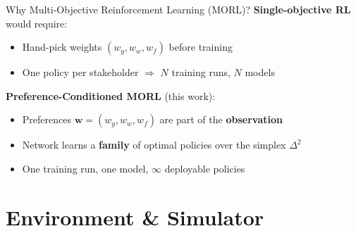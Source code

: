 \documentclass[10pt,aspectratio=169]{beamer}
\newcommand{\wvec}{\mathbf{w}}
\newcommand{\strong}[1]{\textbf{\textcolor{cAccent}{#1}}}
\begin{document}
\begin{frame}{Why Multi-Objective Reinforcement Learning (MORL)?}
  \textbf{Single-objective RL} would require:
  \begin{itemize}
    \item Hand-pick weights $(w_y, w_w, w_f)$ before training
    \item One policy per stakeholder $\Rightarrow$ $N$ training runs, $N$ models
  \end{itemize}

  \vspace{0.8em}
  \textbf{Preference-Conditioned MORL} (this work):
  \begin{itemize}
    \item Preferences $\wvec = (w_y, w_w, w_f)$ are part of the \strong{observation}
    \item Network learns a \strong{family} of optimal policies over the simplex $\Delta^2$
    \item One training run, one model, $\infty$ deployable policies
  \end{itemize}

  \vspace{0.8em}
  \begin{center}
  \end{center}
\end{frame}

\section{Environment \& Simulator}
\end{document}
